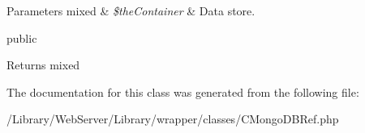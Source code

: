 \begin{DoxyParams}[1]{Parameters}
mixed & {\em \$the\-Container} & Data store.\\
\hline
\end{DoxyParams}
public \begin{DoxyReturn}{Returns}
mixed 
\end{DoxyReturn}


The documentation for this class was generated from the following file\-:\begin{DoxyCompactItemize}
\item 
/\-Library/\-Web\-Server/\-Library/wrapper/classes/C\-Mongo\-D\-B\-Ref.\-php\end{DoxyCompactItemize}
